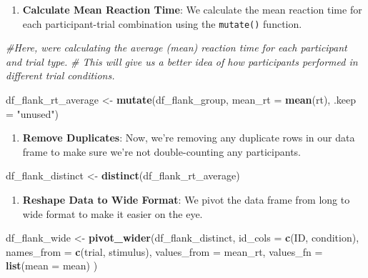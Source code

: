 \documentclass[
]{book}
\newenvironment{Shaded}{\begin{snugshade}}{\end{snugshade}}
\newcommand{\AttributeTok}[1]{\textcolor[rgb]{0.13,0.29,0.53}{#1}}
\newcommand{\CommentTok}[1]{\textcolor[rgb]{0.56,0.35,0.01}{\textit{#1}}}
\newcommand{\FunctionTok}[1]{\textcolor[rgb]{0.13,0.29,0.53}{\textbf{#1}}}
\newcommand{\NormalTok}[1]{#1}
\newcommand{\OtherTok}[1]{\textcolor[rgb]{0.56,0.35,0.01}{#1}}
\newcommand{\StringTok}[1]{\textcolor[rgb]{0.31,0.60,0.02}{#1}}
\providecommand{\tightlist}{%
  \setlength{\itemsep}{0pt}\setlength{\parskip}{0pt}}
\begin{document}
\begin{enumerate}
\def\labelenumi{\arabic{enumi}.}
\setcounter{enumi}{3}
\tightlist
\item
  \textbf{Calculate Mean Reaction Time}: We calculate the mean reaction time for each participant-trial combination using the \texttt{mutate()} function.
\end{enumerate}

\begin{Shaded}
\begin{Highlighting}[]
\CommentTok{\#Here, we\textquotesingle{}re calculating the average (mean) reaction time for each participant and trial type.}
\CommentTok{\# This will give us a better idea of how participants performed in different trial conditions.}

\NormalTok{df\_flank\_rt\_average }\OtherTok{\textless{}{-}} \FunctionTok{mutate}\NormalTok{(df\_flank\_group,}
                              \AttributeTok{mean\_rt =} \FunctionTok{mean}\NormalTok{(rt),}
                              \AttributeTok{.keep =} \StringTok{"unused"}\NormalTok{)}
\end{Highlighting}
\end{Shaded}

\begin{enumerate}
\def\labelenumi{\arabic{enumi}.}
\setcounter{enumi}{4}
\tightlist
\item
  \textbf{Remove Duplicates}: Now, we're removing any duplicate rows in our data frame to make sure we're not double-counting any participants.
\end{enumerate}

\begin{Shaded}
\begin{Highlighting}[]
\NormalTok{df\_flank\_distinct }\OtherTok{\textless{}{-}} \FunctionTok{distinct}\NormalTok{(df\_flank\_rt\_average)}
\end{Highlighting}
\end{Shaded}

\begin{enumerate}
\def\labelenumi{\arabic{enumi}.}
\setcounter{enumi}{5}
\tightlist
\item
  \textbf{Reshape Data to Wide Format}: We pivot the data frame from long to wide format to make it easier on the eye.
\end{enumerate}

\begin{Shaded}
\begin{Highlighting}[]
\NormalTok{df\_flank\_wide }\OtherTok{\textless{}{-}} \FunctionTok{pivot\_wider}\NormalTok{(df\_flank\_distinct,}
  \AttributeTok{id\_cols =} \FunctionTok{c}\NormalTok{(ID, condition),}
  \AttributeTok{names\_from =} \FunctionTok{c}\NormalTok{(trial, stimulus), }
  \AttributeTok{values\_from =}\NormalTok{ mean\_rt,}
  \AttributeTok{values\_fn =} \FunctionTok{list}\NormalTok{(}\AttributeTok{mean =}\NormalTok{ mean)}
\NormalTok{)}
\end{Highlighting}
\end{Shaded}
\end{document}
